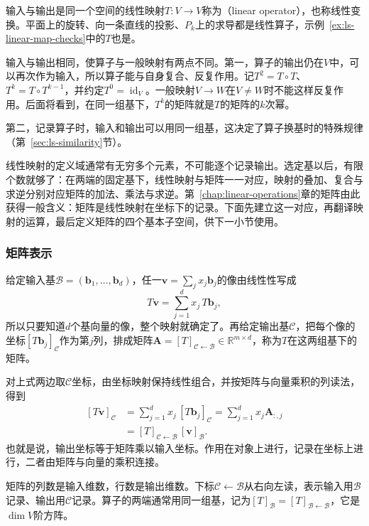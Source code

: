\label{sec:ls-operator-powers}
输入与输出是同一个空间的线性映射$T:V\to V$称为（linear operator），也称线性变换。平面上的旋转、向一条直线的投影、$P_k$上的求导都是线性算子，示例~\ref{ex:ls-linear-map-checks}中的$T$也是。

输入与输出相同，使算子与一般映射有两点不同。第一，算子的输出仍在$V$中，可以再次作为输入，所以算子能与自身复合、反复作用。记$T^2=T\circ T$、$T^k=T\circ T^{k-1}$，并约定$T^0=\operatorname{id}_V$。一般映射$V\to W$在$V\neq W$时不能这样反复作用。后面将看到，在同一组基下，$T^k$的矩阵就是$T$的矩阵的$k$次幂。

第二，记录算子时，输入和输出可以用同一组基，这决定了算子换基时的特殊规律（第~\ref{sec:ls-similarity}节）。

\label{sec:ls-map-representation}
线性映射的定义域通常有无穷多个元素，不可能逐个记录输出。选定基以后，有限个数就够了：在两端的固定基下，线性映射与矩阵一一对应，映射的叠加、复合与求逆分别对应矩阵的加法、乘法与求逆。第~\ref{chap:linear-operations}章的矩阵由此获得一般含义：矩阵是线性映射在坐标下的记录。下面先建立这一对应，再翻译映射的运算，最后定义矩阵的四个基本子空间，供下一小节使用。

\subsubsection{矩阵表示}

给定输入基$\mathcal B=(\bm b_1,\ldots,\bm b_d)$，任一$\bm v=\sum_jx_j\bm b_j$的像由线性性写成
\[
 T\bm v=\sum_{j=1}^d x_j\,T\bm b_j,
\]
所以只要知道$d$个基向量的像，整个映射就确定了。再给定输出基$\mathcal C$，把每个像的坐标$[T\bm b_j]_{\mathcal C}$作为第$j$列，排成矩阵$\bm A=[T]_{\mathcal C\leftarrow\mathcal B}\in\mathbb R^{m\times d}$，称为$T$在这两组基下的矩阵。

对上式两边取$\mathcal C$坐标，由坐标映射保持线性组合，并按矩阵与向量乘积的列读法，得到
\begin{equation}
 \begin{aligned}
 [T\bm v]_{\mathcal C}
 &=\sum_{j=1}^d x_j\,[T\bm b_j]_{\mathcal C}
 =\sum_{j=1}^d x_j\bm A_{:,j}\\
 &=[T]_{\mathcal C\leftarrow\mathcal B}\,[\bm v]_{\mathcal B}.
 \end{aligned}
 \label{eq:linear-algebra-map-matrix-representation}
\end{equation}
也就是说，输出坐标等于矩阵乘以输入坐标。作用在对象上进行，记录在坐标上进行，二者由矩阵与向量的乘积连接。

矩阵的列数是输入维数，行数是输出维数。下标$\mathcal C\leftarrow\mathcal B$从右向左读，表示输入用$\mathcal B$记录、输出用$\mathcal C$记录。算子的两端通常用同一组基，记为$[T]_{\mathcal B}=[T]_{\mathcal B\leftarrow\mathcal B}$，它是$\dim V$阶方阵。

